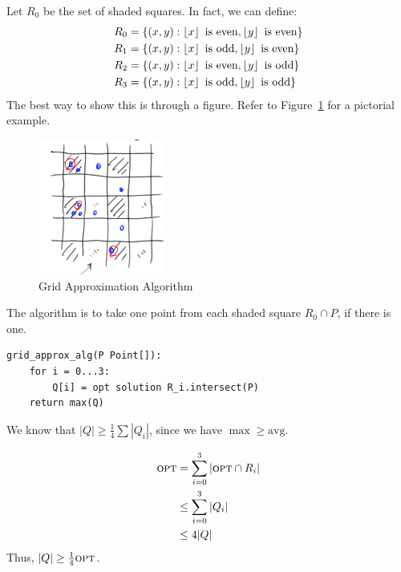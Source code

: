                     Let $R_0$ be the set of shaded squares.
                    In fact, we can define:
                    \begin{align*}
                        R_0 &= \{ (x, y) : \left \lfloor x \right \rfloor \text{ is even}, \left \lfloor y \right \rfloor \text{ is even}\} \\
                        R_1 &= \{ (x, y) : \left \lfloor x \right \rfloor \text{ is odd}, \left \lfloor y \right \rfloor \text{ is even}\} \\
                        R_2 &= \{ (x, y) : \left \lfloor x \right \rfloor \text{ is even}, \left \lfloor y \right \rfloor \text{ is odd}\} \\
                        R_3 &= \{ (x, y) : \left \lfloor x \right \rfloor \text{ is odd}, \left \lfloor y \right \rfloor \text{ is odd}\}
                    \end{align*}
                    The best way to show this is through a figure.
                    Refer to Figure~\ref{fig:grid_approx_alg} for a pictorial example.
                    \begin{figure}[h]
                        \centering
                        \includegraphics{images/grid_approx_alg.png}
                        \caption{Grid Approximation Algorithm}
                        \label{fig:grid_approx_alg}
                    \end{figure}

                    The algorithm is to take one point from each shaded square $R_0 \cap P$, if there is one.

                    \begin{lstlisting}
grid_approx_alg(P Point[]):
    for i = 0...3:
        Q[i] = opt solution R_i.intersect(P)
    return max(Q)
                    \end{lstlisting}
                    We know that $|Q| \ge \frac{1}{4} \sum |Q_i|$, since we have $\max \ge \text{avg}$.

                    \begin{align*}
                        \textsc{opt} &= \sum_{i=0}^3 | \textsc{opt} \cap R_i| \\
                        &\le \sum_{i=0}^3 |Q_i| \\
                        &\le 4|Q|
                    \end{align*}
                    Thus, $|Q| \ge \frac{1}{4} \textsc{opt}$.

